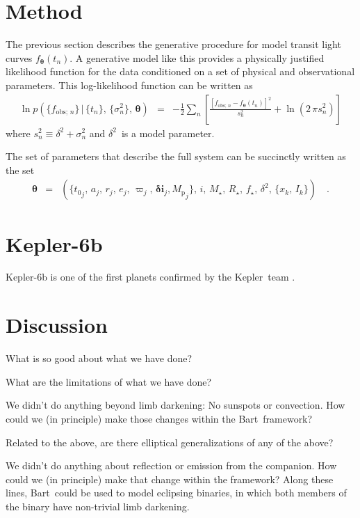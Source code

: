 \documentclass[12pt,preprint]{aastex}
\newcommand{\project}[1]{{\sffamily #1}}
\newcommand{\bart}{\project{Bart}}
\newcommand{\kepler}{\project{Kepler}}
\newcommand{\bvec}[1]{\ensuremath{\boldsymbol{#1}}}
\newcommand{\pr}[1]{\ensuremath{p (#1)}}
\newcommand{\setof}[1]{\ensuremath{\{ #1 \}}}
\newcommand{\model}{\ensuremath{\bvec{\theta}}}
\newcommand{\tobs}{\ensuremath{t_n}}
\newcommand{\fmodel}{\ensuremath{f_{\model} (\tobs)}}
\newcommand{\fobs}{\ensuremath{f_{\mathrm{obs};\,n}}}
\newcommand{\ferr}{\ensuremath{\sigma_n^2}}
\newcommand{\fullerr}{\ensuremath{s_n^2}}
\newcommand{\rstar}{\ensuremath{R_\star}}
\newcommand{\rplanet}{\ensuremath{r}}
\newcommand{\rsurface}{\ensuremath{x}}
\newcommand{\tzero}{\ensuremath{{t_0}}}
\newcommand{\smaxis}{\ensuremath{a}}
\newcommand{\ecc}{\ensuremath{e}}
\newcommand{\pomega}{\ensuremath{\varpi}}
\newcommand{\incl}{\ensuremath{\bvec{\delta i}}}
\newcommand{\mplanet}{\ensuremath{{M_\mathrm{p}}}}
\newcommand{\jitter}{\ensuremath{\delta^2}}
\newcommand{\mstar}{\ensuremath{M_\star}}
\newcommand{\fstar}{\ensuremath{f_\star}}
\newcommand{\iobs}{\ensuremath{i}}
\begin{document}
\section{Method}

The previous section describes the generative procedure for model transit
light curves \fmodel.
A generative model like this provides a physically justified likelihood
function for the data conditioned on a set of physical and observational
parameters.
This log-likelihood function can be written as
\begin{eqnarray}
    \ln \pr{\setof{\fobs}\,|\,\setof{\tobs},\,\setof{\ferr},\,\model}
    & = & -\frac{1}{2} \sum_{n} \left [ \frac{[\fobs - \fmodel]^2}{\fullerr}
+ \ln \left ( 2\,\pi\fullerr \right ) \right ]
\end{eqnarray}
where $\fullerr \equiv \jitter + \ferr$ and \jitter\ is a model parameter.

The set of parameters that describe the full system can be succinctly written
as the set
\begin{eqnarray}
    \model & = & \left (
        \setof{\tzero_j,\,\smaxis_j,\,\rplanet_j,\,\ecc_j,\,\pomega_j,\,
        \incl_j, \mplanet_j},\,\iobs,\,\mstar,\,\rstar,\,\fstar,\,\jitter,\,
        \setof{\rsurface_k,\,I_k}
    \right ) \quad.
\end{eqnarray}


\section{Kepler-6b}

Kepler-6b is one of the first planets confirmed by the \kepler\ team
\citep{kepler6b}.


\section{Discussion}

What is so good about what we have done?

What are the limitations of what we have done?

We didn't do anything beyond limb darkening:  No sunspots or convection.
How could we (in principle) make those changes within the \bart\ framework?

Related to the above, are there elliptical generalizations of any of the above?

We didn't do anything about reflection or emission from the companion.
How could we (in principle) make that change within the framework?
Along these lines, \bart\ could be used to model eclipsing binaries,
in which both members of the binary have non-trivial limb darkening.
\end{document}
